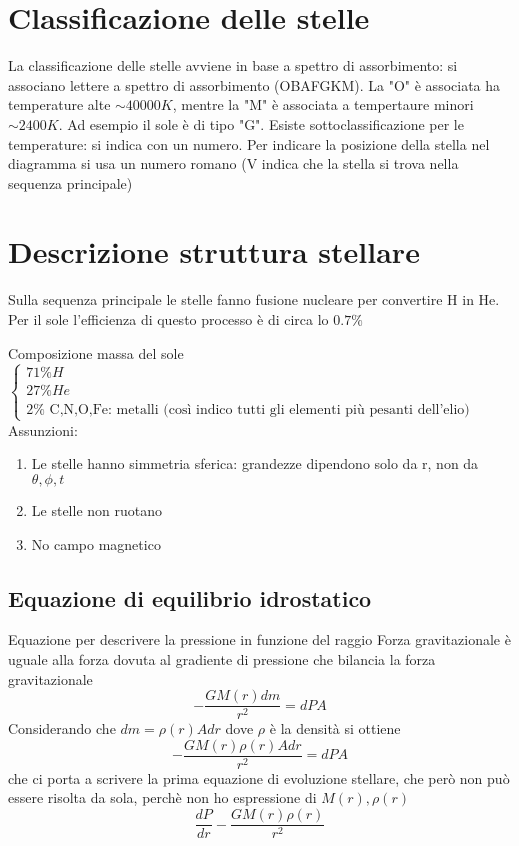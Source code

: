 \documentclass[a4paper,11pt]{report}
\theoremstyle{remark}
\theoremstyle{definition}
\begin{document}
\section{Classificazione delle stelle}
La classificazione delle stelle avviene in base a spettro di assorbimento: si associano lettere a spettro di assorbimento (OBAFGKM). La "O" è associata ha temperature alte $\sim 40000 K$, mentre la "M" è associata a tempertaure minori $\sim 2400 K$. Ad esempio il sole è di tipo "G". Esiste sottoclassificazione per le temperature: si indica con un numero. Per indicare la posizione della stella nel diagramma si usa un numero romano (V indica che la stella si trova nella sequenza principale)

\section{Descrizione struttura stellare}

Sulla sequenza principale le stelle fanno fusione nucleare per convertire H in He. Per il sole l'efficienza di questo processo è di circa lo $0.7\%$ 

\noindent Composizione massa del sole $\begin{cases}
    71 \% H \\
    27 \% He \\
    2 \% \text{ C,N,O,Fe: metalli (così indico tutti gli elementi più pesanti dell'elio)}
\end{cases}$ 
Assunzioni:
\begin{enumerate}
    \item Le stelle hanno simmetria sferica: grandezze dipendono solo da r, non da $\theta,\phi,t$
    \item Le stelle non ruotano
    \item No campo magnetico
\end{enumerate}

\subsection{Equazione di equilibrio idrostatico}

Equazione per descrivere la pressione in funzione del raggio \newline
Forza gravitazionale è uguale alla forza dovuta al gradiente di pressione che bilancia la forza gravitazionale
\begin{equation*}
    -\frac{GM(r)dm}{r^2} = dP A
\end{equation*}
Considerando che $dm = \rho(r)A dr$ dove $\rho$ è la densità si ottiene
\begin{equation}
    -\frac{GM(r)\rho(r)A dr}{r^2} = dP A
\end{equation}
che ci porta a scrivere la prima equazione di evoluzione stellare, che però non può essere risolta da sola, perchè non ho espressione di $M(r), \rho(r)$
\begin{equation*}
   \frac{dP}{dr} -\frac{GM(r)\rho(r)}{r^2}
\end{equation*}
\end{document}

